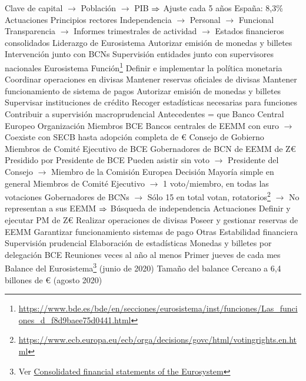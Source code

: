 \documentclass{nuevotema}
\begin{document}
\begin{esquemal}
				\4[] Clave de capital
				\4[] $\to$ Población
				\4[] $\to$ PIB
				\4[] $\Rightarrow$ Ajuste cada 5 años
				\4[] España: 8,3\%
			\3 Actuaciones
				\4 Principios rectores
				\4[] Independencia
				\4[] $\to$ Personal
				\4[] $\to$ Funcional
				\4[] Transparencia
				\4[] $\to$ Informes trimestrales de actividad
				\4[] $\to$ Estados financieros consolidados
				\4 Liderazgo de Eurosistema
				\4 Autorizar emisión de monedas y billetes
				\4 Intervención junto con BCNs
				\4 Supervisión entidades junto con supervisores nacionales
		\2 Eurosistema
			\3 Función\footnote{\url{https://www.bde.es/bde/en/secciones/eurosistema/inst/funciones/Las_funciones_d_f8d9baee75d0441.html}}
				\4 Definir e implementar la política monetaria
				\4 Coordinar operaciones en divisas
				\4 Mantener reservas oficiales de divisas
				\4 Mantener funcionamiento de sistema de pagos
				\4 Autorizar emisión de monedas y billetes
				\4 Supervisar instituciones de crédito
				\4 Recoger estadísticas necesarias para funciones
				\4 Contribuir a supervisión macroprudencial
			\3 Antecedentes
				\4 = que Banco Central Europeo
			\3 Organización
				\4 Miembros
				\4[] BCE
				\4[] Bancos centrales de EEMM con euro
				\4[] $\to$ Coexiste con SECB hasta adopción completa de €
				\4 Consejo de Gobierno
				\4[] Miembros de Comité Ejecutivo de BCE
				\4[] Gobernadores de BCN de EEMM de Z€
				\4[] Presidido por Presidente de BCE
				\4[] Pueden asistir sin voto
				\4[] $\to$ Presidente del Consejo
				\4[] $\to$ Miembro de la Comisión Europea
				\4 Decisión
				\4[] Mayoría simple en general
				\4[] Miembros de Comité Ejecutivo
				\4[] $\to$ 1 voto/miembro, en todas las votaciones
				\4[] Gobernadores de BCNs
				\4[] $\to$ Sólo 15 en total votan, rotatorios\footnote{\url{https://www.ecb.europa.eu/ecb/orga/decisions/govc/html/votingrights.en.html}}
				\4[] $\to$ No representan a sus EEMM
				\4[] $\Rightarrow$ Búsqueda de independencia
			\3 Actuaciones
				\4 Definir y ejecutar PM de Z€
				\4 Realizar operaciones de divisas
				\4 Poseer y gestionar reservas de EEMM
				\4 Garantizar funcionamiento sistemas de pago
				\4 Otras
				\4[] Estabilidad financiera
				\4[] Supervisión prudencial
				\4[] Elaboración de estadísticas
				\4[] Monedas y billetes por delegación BCE
				\4 Reuniones
				 veces al año al menos
				\4[] Primer jueves de cada mes
			\3 Balance del Eurosistema\footnote{Ver \href{https://www.ecb.europa.eu/press/pr/wfs/2020/html/index.en.html}{Consolidated financial statements of the Eurosystem}}
				\4 (junio de 2020)
				\4 Tamaño del balance
				\4[] Cercano a 6,4 billones de € (agosto 2020)

\end{esquemal}
\end{document}
